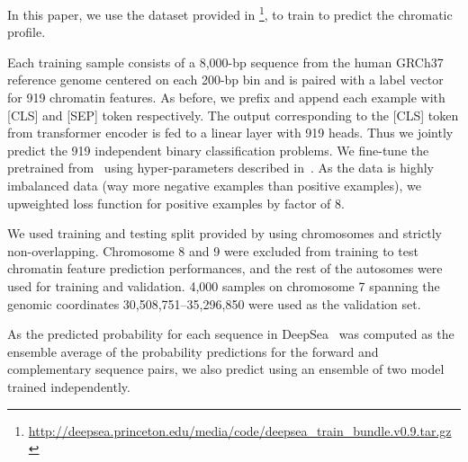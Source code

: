 In this paper, we use the dataset provided in \citet{zhou2015predicting}\footnote{ \url{http://deepsea.princeton.edu/media/code/deepsea_train_bundle.v0.9.tar.gz}}, to train \bigb to predict the chromatic profile.




Each training sample consists of a 8,000-bp sequence from the human GRCh37 reference genome centered on each 200-bp bin and is paired with a label vector for 919 chromatin features.
As before, we prefix and append each example with [CLS] and [SEP] token respectively.
The output corresponding to the [CLS] token from \bigb transformer encoder is fed to a linear layer with 919 heads. Thus we jointly predict the 919 independent binary classification problems.
We fine-tune the pretrained \bigb from~ using hyper-parameters described in~.
As the data is highly imbalanced data (way more negative examples than positive examples), we upweighted loss function for positive examples by factor of 8.

We used training and testing split provided by \citet{zhou2015predicting} using chromosomes and strictly non-overlapping. Chromosome 8 and 9 were excluded from training to test chromatin feature prediction performances, and the rest of the autosomes were used for training and validation. 4,000 samples on chromosome 7 spanning the genomic coordinates 30,508,751–35,296,850 were used as the validation set. 

As the predicted probability for each sequence in DeepSea~\citet{zhou2015predicting} was computed as the ensemble average of the probability predictions for the forward and complementary sequence pairs, we also predict using an ensemble of two \bigb model trained independently.